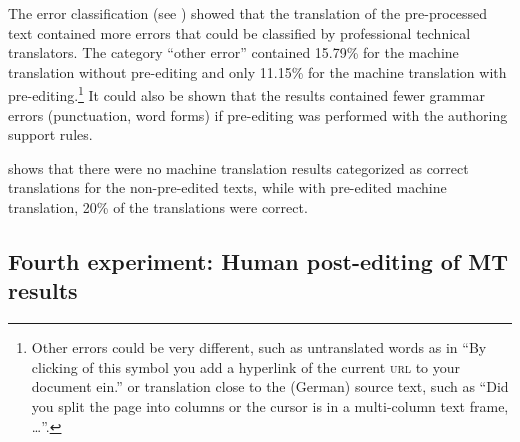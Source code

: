 \documentclass[output=paper]{LSP/langsci}
\begin{document}
The error classification (see ) showed that the translation of the pre-processed text contained more errors that could be classified by professional technical translators. The category ``other error'' contained 15.79\% for the machine translation without pre-editing and only 11.15\% for the machine translation with pre-editing.\footnote{ Other errors could be very different, such as untranslated words as in ``By clicking of this symbol you add a hyperlink of the current \textsc{url} to your document ein.'' or translation close to the (German) source text, such as ``Did you split the page into columns or the cursor is in a multi-column text frame, \ldots''.} It could also be shown that the results contained fewer grammar errors (punctuation, word forms) if pre-editing was performed with the authoring support rules. 

 shows that there were no machine translation results categorized as correct translations for the non-pre-edited texts, while with pre-edited machine translation, 20\% of the translations were correct. 

\begin{table}
\caption{Comparison of sentences classified as correct translations, original and pre-edited sentences}
\label{tab:siegel:3}
\end{table}

\subsection{Fourth experiment: Human post-editing of MT results}\label{sec:siegel:6.4}
\end{document}
